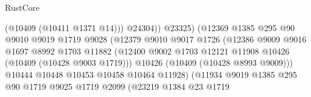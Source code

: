 \begin{lexlean}{RustCore}
\begin{coremodule}
                                                (@10409 (@10411 @1371 @14)))
                                              @24304))
                                          @23325)
                                        (@12369
                                          @1385
                                          @295
                                          @90
                                          @9010
                                          @9019
                                          @1719
                                          @9028
                                          (@12379
                                            @9010
                                            @9017
                                            @1726
                                            (@12386
                                              @9009
                                              @9016
                                              @1697
                                              @8992
                                              @1703
                                              @11882
                                              (@12400
                                                @9002
                                                @1703
                                                @12121
                                                @11908
                                                @10426
                                                (@10409 (@10428 @9003 @1719)))
                                              @10426
                                              (@10409 (@10428 @8993 @9009)))
                                            @10444
                                            @10448
                                            @10453
                                            @10458
                                            @10464
                                            @11928)
                                          (@11934
                                            @9019
                                            @1385
                                            @295
                                            @90
                                            @1719
                                            @9025
                                            @1719
                                            @2099
                                            (@23219
                                              @1384
                                              @23
                                              @1719

\end{coremodule}
\end{lexlean}
